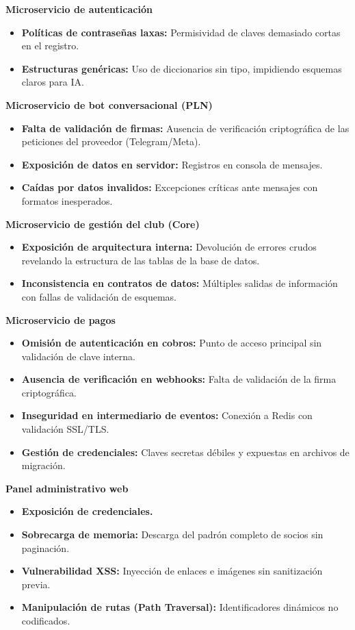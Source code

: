 \noindent \textbf{Microservicio de autenticación}
\begin{itemize}
    \item \textbf{Políticas de contraseñas laxas:} Permisividad de claves demasiado cortas en el registro.
    \item \textbf{Estructuras genéricas:} Uso de diccionarios sin tipo, impidiendo esquemas claros para IA.
\end{itemize}

\newpage

\noindent \textbf{Microservicio de bot conversacional (PLN)}
\begin{itemize}
    \item \textbf{Falta de validación de firmas:} Ausencia de verificación criptográfica de las peticiones del proveedor (Telegram/Meta).
    \item \textbf{Exposición de datos en servidor:} Registros en consola de mensajes.
    \item \textbf{Caídas por datos invalidos:} Excepciones críticas ante mensajes con formatos inesperados.
\end{itemize}

\noindent \textbf{Microservicio de gestión del club (Core)}
\begin{itemize}
    \item \textbf{Exposición de arquitectura interna:} Devolución de errores crudos revelando la estructura de las tablas de la base de datos.
    \item \textbf{Inconsistencia en contratos de datos:} Múltiples salidas de información con fallas de validación de esquemas.
\end{itemize}

\noindent \textbf{Microservicio de pagos}
\begin{itemize}
    \item \textbf{Omisión de autenticación en cobros:} Punto de acceso principal sin validación de clave interna.
    \item \textbf{Ausencia de verificación en webhooks:} Falta de validación de la firma criptográfica.
    \item \textbf{Inseguridad en intermediario de eventos:} Conexión a Redis con validación SSL/TLS.
    \item \textbf{Gestión de credenciales:} Claves secretas débiles y expuestas en archivos de migración.
\end{itemize}

\noindent \textbf{Panel administrativo web}
\begin{itemize}
    \item \textbf{Exposición de credenciales.}
    \item \textbf{Sobrecarga de memoria:} Descarga del padrón completo de socios sin paginación.
    \item \textbf{Vulnerabilidad XSS:} Inyección de enlaces e imágenes sin sanitización previa.
    \item \textbf{Manipulación de rutas (Path Traversal):} Identificadores dinámicos no codificados.
\end{itemize}

